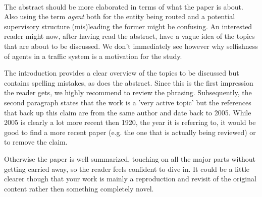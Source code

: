 \documentclass[../review.tex]{subfiles}
\begin{document}
\\
The abstract should be more elaborated in terms of what the paper is about. Also using the term \textit{agent} both for the entity being routed and a potential supervisory structure (mis)leading the former might be confusing. An interested reader might now, after having read the abstract, have a vague idea of the topics that are about to be discussed. We don't immediately see however why selfishness of agents in a traffic system is a motivation for the study.

The introduction provides a clear overview of the topics to be discussed but contains spelling mistakes, as does the abstract. Since this is the first impression the reader gets, we highly recommend to review the phrasing. Subsequently, the second paragraph states that the work is a 'very active topic' but the references that back up this claim are from the same author and date back to 2005. While 2005 is clearly a lot more recent then 1920, the year it is referring to, it would be good to find a more recent paper (e.g. the one that is actually being reviewed) or to remove the claim.

Otherwise the paper is well summarized, touching on all the major parts without getting carried away, so the reader feels confident to dive in. It could be a little clearer though that your work is mainly a reproduction and revisit of the original content rather then something completely novel.
\end{document}
